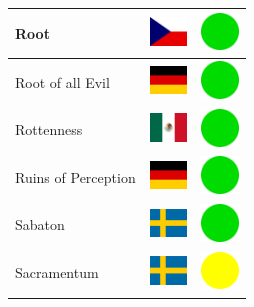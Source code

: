 \documentclass[12pt, a4paper, twoside]{report}
\begin{document}
\begin{center}
\begin{longtable}{|p{5cm}|p{2cm}|p{2cm}|}
 Root                                                       & \includegraphics[width=1cm]{4x3/cz} &   \includegraphics[width=1cm]{likes/y} \\ \hline
 Root of all Evil                                           & \includegraphics[width=1cm]{4x3/de} &   \includegraphics[width=1cm]{likes/y} \\ \hline
 Rottenness                                                 & \includegraphics[width=1cm]{4x3/mx} &   \includegraphics[width=1cm]{likes/y} \\ \hline
 Ruins of Perception                                        & \includegraphics[width=1cm]{4x3/de} &   \includegraphics[width=1cm]{likes/y} \\ \hline
 Sabaton                                                    & \includegraphics[width=1cm]{4x3/se} &   \includegraphics[width=1cm]{likes/y} \\ \hline
 Sacramentum﻿                                                & \includegraphics[width=1cm]{4x3/se} &   \includegraphics[width=1cm]{likes/m} \\ \hline

\end{longtable}
\end{center}
\end{document}
